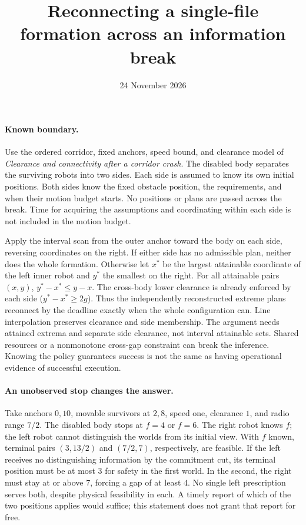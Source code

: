 \documentclass[11pt]{article}
\title{Reconnecting a single-file formation across an information break}
\date{24 November 2026}
\begin{document}
\maketitle

\paragraph{Known boundary.}
Use the ordered corridor, fixed anchors, speed bound, and clearance
model of \emph{Clearance and connectivity after a corridor crash}.
The disabled body separates the surviving robots into two sides.
Each side is assumed to know its own initial positions. Both sides
know the fixed obstacle position, the requirements, and when their
motion budget starts. No positions or plans are passed across the
break. Time for acquiring the assumptions and coordinating within
each side is not included in the motion budget.

Apply the interval scan from the outer anchor toward the body on each side,
reversing coordinates on the right. If either side has no admissible plan,
neither does the whole formation. Otherwise let \(x^*\) be the largest
attainable coordinate of the left inner robot and \(y^*\) the smallest on
the right. For all attainable pairs \((x,y)\), \(y^*-x^*\le y-x\).
The cross-body lower clearance is already enforced by each side
(\(y^*-x^*\ge2g\)). Thus the independently reconstructed extreme plans
reconnect by the deadline exactly when the whole configuration can.
Line interpolation preserves clearance and side membership. The argument
needs attained extrema and separate side clearance, not interval
attainable sets. Shared resources or a nonmonotone cross-gap constraint
can break the inference. Knowing the policy guarantees success is not
the same as having operational evidence of successful execution.

\paragraph{An unobserved stop changes the answer.}
Take anchors \(0,10\), movable survivors at \(2,8\), speed one,
clearance \(1\), and radio range \(7/2\). The disabled body stops at \(f=4\)
or \(f=6\). The right robot knows \(f\); the left robot cannot distinguish
the worlds from its initial view. With \(f\) known, terminal pairs
\((3,13/2)\) and \((7/2,7)\), respectively, are feasible.
If the left receives no distinguishing information by the commitment
cut, its terminal position must be at most \(3\) for safety in the first
world. In the second, the right must stay at or above \(7\), forcing a
gap of at least \(4\). No single left prescription serves both, despite
physical feasibility in each. A timely report of which of the two
positions applies would suffice; this statement does not grant that
report for free.
\end{document}
